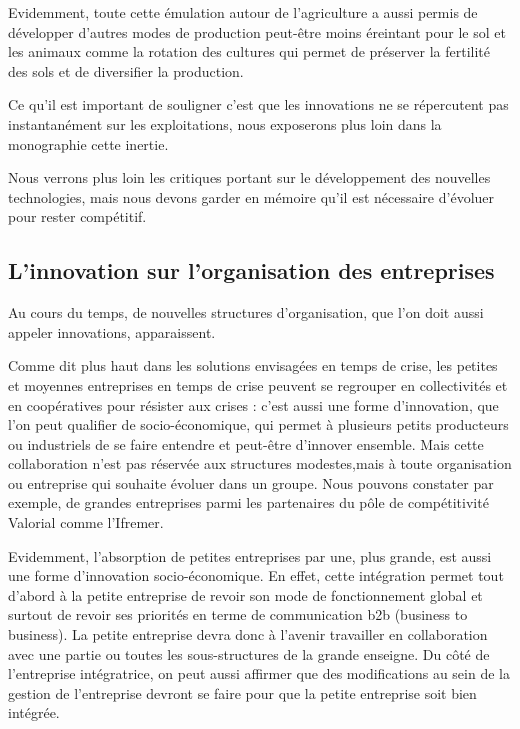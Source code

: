 \documentclass[a4paper,12pt]{report}
\begin{document}
			Evidemment, toute cette émulation autour de l’agriculture a aussi permis de développer d’autres modes de production peut-être moins éreintant pour le sol et les animaux comme la rotation des cultures qui permet de préserver la fertilité des sols et de diversifier la production.
			
			
			Ce qu'il est important de souligner c’est que les innovations ne se répercutent pas instantanément sur les exploitations, nous exposerons plus loin dans la monographie cette inertie.
			
			Nous verrons plus loin les critiques portant sur le développement des nouvelles technologies, mais nous devons garder en mémoire qu’il est nécessaire d’évoluer pour rester compétitif.
			
			
		\subsection{L'innovation sur l'organisation des entreprises}
			Au cours du temps, de nouvelles structures d’organisation, que l’on doit aussi appeler innovations, apparaissent.
			
			Comme dit plus haut dans les solutions envisagées en temps de crise, les petites et moyennes entreprises en temps de crise peuvent se regrouper en collectivités et en coopératives pour résister aux crises : c’est aussi une forme d’innovation, que l’on peut qualifier de socio-économique, qui permet à plusieurs petits producteurs ou industriels de se faire entendre et peut-être d’innover ensemble. 
			Mais cette collaboration n’est pas réservée aux structures modestes,mais à toute organisation ou entreprise qui souhaite évoluer dans un groupe. Nous pouvons constater par exemple, de grandes entreprises parmi les partenaires du pôle de compétitivité Valorial comme l’Ifremer.
			
			Evidemment, l’absorption de petites entreprises par une, plus grande, est aussi une forme d’innovation socio-économique. En effet, cette intégration permet tout d’abord à la petite entreprise de revoir son mode de fonctionnement global et surtout de revoir ses priorités en terme de communication b2b (business to business). La petite entreprise devra donc à l’avenir travailler en collaboration avec une partie ou toutes les sous-structures de la grande enseigne.
			Du côté de l’entreprise intégratrice, on peut aussi affirmer que des modifications au sein de la gestion de l’entreprise devront se faire pour que la petite entreprise soit bien intégrée. 
			
\end{document}
